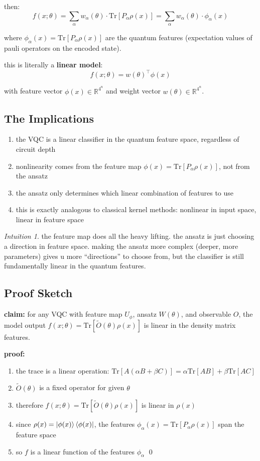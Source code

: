 \documentclass[11pt,a4paper]{article}
\theoremstyle{definition}
\theoremstyle{remark}
\newtheorem*{intuition}{Intuition}
\begin{document}
then:
\[
f(x; \theta) = \sum_\alpha w_\alpha(\theta) \cdot \text{Tr}[P_\alpha \rho(x)] = \sum_\alpha w_\alpha(\theta) \cdot \phi_\alpha(x)
\]

where $\phi_\alpha(x) = \text{Tr}[P_\alpha \rho(x)]$ are the quantum features (expectation values of pauli operators on the encoded state).

this is literally a \textbf{linear model}:
\[
f(x; \theta) = w(\theta)^\top \phi(x)
\]

with feature vector $\phi(x) \in \mathbb{R}^{4^n}$ and weight vector $w(\theta) \in \mathbb{R}^{4^n}$.

\subsection{The Implications}

\begin{enumerate}
    \item the VQC is a linear classifier in the quantum feature space, regardless of circuit depth
    \item nonlinearity comes from the feature map $\phi(x) = \text{Tr}[P_\alpha \rho(x)]$, not from the ansatz
    \item the ansatz only determines which linear combination of features to use
    \item this is exactly analogous to classical kernel methods: nonlinear in input space, linear in feature space
\end{enumerate}

\begin{intuition}
the feature map does all the heavy lifting. the ansatz is just choosing a direction in feature space. making the ansatz more complex (deeper, more parameters) gives u more ``directions'' to choose from, but the classifier is still fundamentally linear in the quantum features.
\end{intuition}

\subsection{Proof Sketch}

\textbf{claim:} for any VQC with feature map $U_\phi$, ansatz $W(\theta)$, and observable $O$, the model output $f(x;\theta) = \text{Tr}[\tilde{O}(\theta) \rho(x)]$ is linear in the density matrix features.

\textbf{proof:}
\begin{enumerate}
    \item the trace is a linear operation: $\text{Tr}[A(\alpha B + \beta C)] = \alpha\text{Tr}[AB] + \beta\text{Tr}[AC]$
    \item $\tilde{O}(\theta)$ is a fixed operator for given $\theta$
    \item therefore $f(x;\theta) = \text{Tr}[\tilde{O}(\theta)\rho(x)]$ is linear in $\rho(x)$
    \item since $\rho(x) = \ket{\phi(x)}\bra{\phi(x)}$, the features $\phi_\alpha(x) = \text{Tr}[P_\alpha \rho(x)]$ span the feature space
    \item so $f$ is a linear function of the features $\phi_\alpha$ \qed
\end{enumerate}
\end{document}
